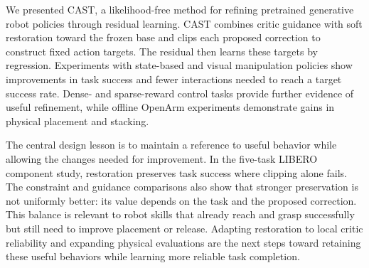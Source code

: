 We presented CAST, a likelihood-free method for refining pretrained
generative robot policies through residual learning. CAST combines
critic guidance with soft restoration toward the frozen base and clips
each proposed correction to construct fixed action targets. The residual
then learns these targets by regression. Experiments with state-based and
visual manipulation policies show improvements in task success and fewer
interactions needed to reach a target success rate. Dense- and
sparse-reward control tasks provide further evidence of useful refinement,
while offline OpenArm experiments demonstrate gains in physical placement
and stacking.

The central design lesson is to maintain a reference to useful behavior
while allowing the changes needed for improvement. In the five-task
LIBERO component study, restoration preserves task success where clipping
alone fails. The constraint and guidance comparisons also show that
stronger preservation is not uniformly better: its value depends on the
task and the proposed correction. This balance is relevant to robot skills
that already reach and grasp successfully but still need to improve
placement or release. Adapting restoration to local critic reliability
and expanding physical evaluations are the next steps toward retaining
these useful behaviors while learning more reliable task completion.
